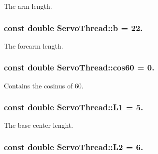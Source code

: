 The arm length. 

\hypertarget{class_servo_thread_a14f03febaa39a60b9bf7ff9b9151060c}{}
\subsubsection[{b}]{\setlength{\rightskip}{0pt plus 5cm}const double Servo\+Thread\+::b = 22.\hspace{0.3cm}{\ttfamily [private]}}\label{class_servo_thread_a14f03febaa39a60b9bf7ff9b9151060c}


The forearm length. 

\hypertarget{class_servo_thread_a86dc58ff23326f939cd6fb610ac90d53}{}
\subsubsection[{cos60}]{\setlength{\rightskip}{0pt plus 5cm}const double Servo\+Thread\+::cos60 = 0.\hspace{0.3cm}{\ttfamily [private]}}\label{class_servo_thread_a86dc58ff23326f939cd6fb610ac90d53}


Contains the cosinus of 60. 

\hypertarget{class_servo_thread_a6281142e50115dd8c914c14cfae6f90d}{}
\subsubsection[{L1}]{\setlength{\rightskip}{0pt plus 5cm}const double Servo\+Thread\+::\+L1 = 5.\hspace{0.3cm}{\ttfamily [private]}}\label{class_servo_thread_a6281142e50115dd8c914c14cfae6f90d}


The base center lenght. 

\hypertarget{class_servo_thread_a3d51c16b1f498b48a6ecbfaadaba6ed2}{}
\subsubsection[{L2}]{\setlength{\rightskip}{0pt plus 5cm}const double Servo\+Thread\+::\+L2 = 6.\hspace{0.3cm}{\ttfamily [private]}}\label{class_servo_thread_a3d51c16b1f498b48a6ecbfaadaba6ed2}


